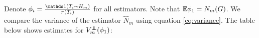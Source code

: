 
Denote $\phi_i = \frac{\ind(T_i\sim H_m)}{\pi(T_i)}$ for all estimators.
Note that $\mathbb{E} \phi_1 = N_m(G)$.
We compare the variance of the estimator $\hat N_m$ using equation \eqref{eq:variance}.
The table below shows estimates for $V_m^{\independent}(\phi_1)$:

